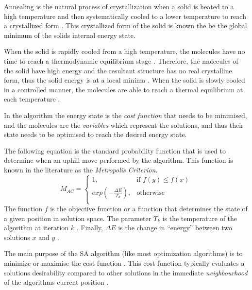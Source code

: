 Annealing is the natural process of crystallization when a solid is heated to a high temperature and then systematically cooled to a lower temperature to reach a crystallized form \cite{CurveFittingSA,NewSAs,MobileRobotSA,ConstantTempSA}. This crystallized form of the solid is known the be the global minimum of the solids internal energy state. 

When the solid is rapidly cooled from a high temperature, the molecules have no time to reach a thermodynamic equilibrium stage \cite{CurveFittingSA,NewSAs,MobileRobotSA,ConstantTempSA}. Therefore, the molecules of the solid have high energy and the resultant structure has no real crystalline form, thus the solid energy is at a local minima \cite{CurveFittingSA,NewSAs,MobileRobotSA}. When the solid is slowly cooled in a controlled manner, the molecules are able to reach a thermal equilibrium at each temperature \cite{ChaosSA,CurveFittingSA,NewSAs,MobileRobotSA,ConstantTempSA}.

In the algorithm the energy state is the \emph{cost function} that needs to be minimised, and the molecules are the \emph{variables} which represent the solutions, and thus their state needs to be optimised to reach the desired energy state.

The following equation is the standard probability function that is used to determine when an uphill move performed by the algorithm. This function is known in the literature as the \emph{Metropolis Criterion}. 
\begin{equation}
	M_{AC} =
	\begin{cases}
	1, &\text{if $f(y) \leq f(x)$}\\
	exp(-\frac{\Delta E}{T_k}), &\text{otherwise}\\
	\end{cases}
\end{equation}
The function $f$ is the objective function or a function that determines the state of a given position in solution space\cite{EcoEquilSA}. The parameter $T_k$ is the temperature of the algorithm at iteration $k$ \cite{EcoEquilSA}. Finally, $\Delta E$ is the change in ``energy'' between two solutions $x$ and $y$ \cite{EcoEquilSA}.

The main purpose of the SA algorithm (like most optimization algorithms) is to minimize or maximise the cost function \cite{SASingleMultiObj}. This cost function typically evaluates a solutions desirability compared to other solutions in the immediate \emph{neighbourhood} of the algorithms current position \cite{TheoPraticalSA}. 

